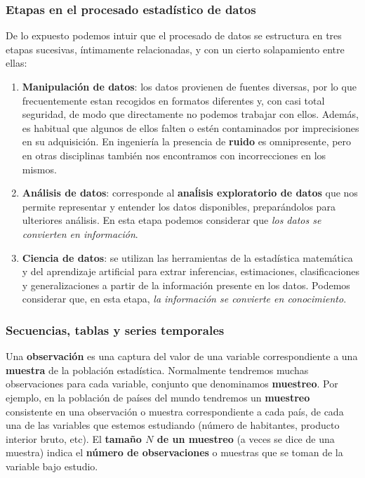 \documentclass[11pt]{article}
\providecommand{\tightlist}{%
      \setlength{\itemsep}{0pt}\setlength{\parskip}{0pt}}
\begin{document}
    \subsubsection*{Etapas en el procesado estadístico de
datos}\label{etapas-en-el-procesado-estaduxedstico-de-datos}

De lo expuesto podemos intuir que el procesado de datos se estructura en
tres etapas sucesivas, íntimamente relacionadas, y con un cierto
solapamiento entre ellas:

\begin{enumerate}
\def\labelenumi{\arabic{enumi}.}
\tightlist
\item
  \textbf{Manipulación de datos}: los datos provienen de fuentes
  diversas, por lo que frecuentemente estan recogidos en formatos
  diferentes y, con casi total seguridad, de modo que directamente no
  podemos trabajar con ellos. Además, es habitual que algunos de ellos
  falten o estén contaminados por imprecisiones en su adquisición. En
  ingeniería la presencia de \textbf{ruido} es omnipresente, pero en
  otras disciplinas también nos encontramos con incorrecciones en los
  mismos.
\item
  \textbf{Análisis de datos}: corresponde al \textbf{anaĺisis
  exploratorio de datos} que nos permite representar y entender los
  datos disponibles, preparándolos para ulteriores análisis. En esta
  etapa podemos considerar que \emph{los datos se convierten en
  información}.
\item
  \textbf{Ciencia de datos}: se utilizan las herramientas de la
  estadística matemática y del aprendizaje artificial para extrar
  inferencias, estimaciones, clasificaciones y generalizaciones a partir
  de la información presente en los datos. Podemos considerar que, en
  esta etapa, \emph{la información se convierte en conocimiento}.
\end{enumerate}

    \subsubsection*{Secuencias, tablas y series
temporales}\label{secuencias-tablas-y-series-temporales}

Una \textbf{observación} es una captura del valor de una variable
correspondiente a una \textbf{muestra} de la población estadística.
Normalmente tendremos muchas observaciones para cada variable, conjunto
que denominamos \textbf{muestreo}. Por ejemplo, en la población de
países del mundo tendremos un \textbf{muestreo} consistente en una
observación o muestra correspondiente a cada país, de cada una de las
variables que estemos estudiando (número de habitantes, producto
interior bruto, etc). El \textbf{tamaño \(N\) de un muestreo} (a veces
se dice de una muestra) indica el \textbf{número de observaciones} o
muestras que se toman de la variable bajo estudio.
\end{document}
